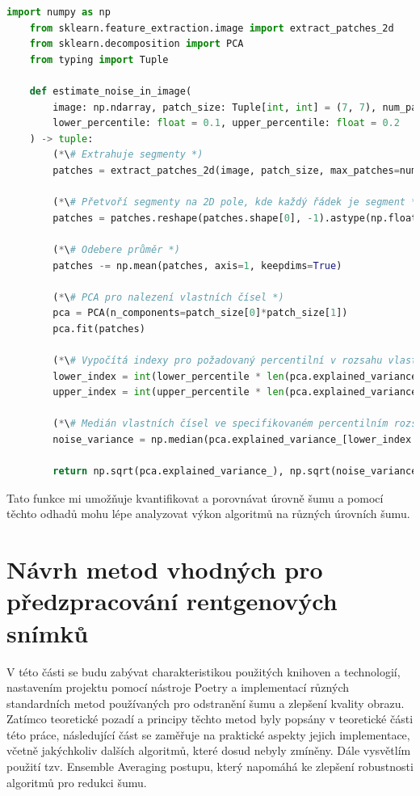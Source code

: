 \documentclass[male,czech,api_ing]{thesis}
\begin{document}
\begin{lstlisting}[language=Python, caption={Funkce pro odhad směrodatné odchylky šumu ve snímku}, label={lst:noise_estimation}]
    import numpy as np
    from sklearn.feature_extraction.image import extract_patches_2d
    from sklearn.decomposition import PCA
    from typing import Tuple

    def estimate_noise_in_image(
        image: np.ndarray, patch_size: Tuple[int, int] = (7, 7), num_patches: int = 1000,
        lower_percentile: float = 0.1, upper_percentile: float = 0.2
    ) -> tuple:
        (*\# Extrahuje segmenty *)
        patches = extract_patches_2d(image, patch_size, max_patches=num_patches)
        
        (*\# Přetvoří segmenty na 2D pole, kde každý řádek je segment *)
        patches = patches.reshape(patches.shape[0], -1).astype(np.float32)
        
        (*\# Odebere průměr *)
        patches -= np.mean(patches, axis=1, keepdims=True)
        
        (*\# PCA pro nalezení vlastních čísel *)
        pca = PCA(n_components=patch_size[0]*patch_size[1])
        pca.fit(patches)
        
        (*\# Vypočítá indexy pro požadovaný percentilní v rozsahu vlastních čísel *)
        lower_index = int(lower_percentile * len(pca.explained_variance_))
        upper_index = int(upper_percentile * len(pca.explained_variance_))
        
        (*\# Medián vlastních čísel ve specifikovaném percentilním rozsahu *)
        noise_variance = np.median(pca.explained_variance_[lower_index:upper_index])
        
        return np.sqrt(pca.explained_variance_), np.sqrt(noise_variance)
\end{lstlisting}

Tato funkce mi umožňuje kvantifikovat a porovnávat úrovně šumu a pomocí těchto odhadů mohu lépe analyzovat výkon algoritmů na různých úrovních šumu.

\section{Návrh metod vhodných pro předzpracování rentgenových snímků}
V této části se budu zabývat charakteristikou použitých knihoven a technologií, nastavením projektu pomocí nástroje Poetry a implementací různých standardních metod používaných pro odstranění šumu a zlepšení kvality obrazu. Zatímco teoretické pozadí a principy těchto metod byly popsány v teoretické části této práce, následující část se zaměřuje na praktické aspekty jejich implementace, včetně jakýchkoliv dalších algoritmů, které dosud nebyly zmíněny. Dále vysvětlím použití tzv. Ensemble Averaging postupu, který napomáhá ke zlepšení robustnosti algoritmů pro redukci šumu.
\end{document}
